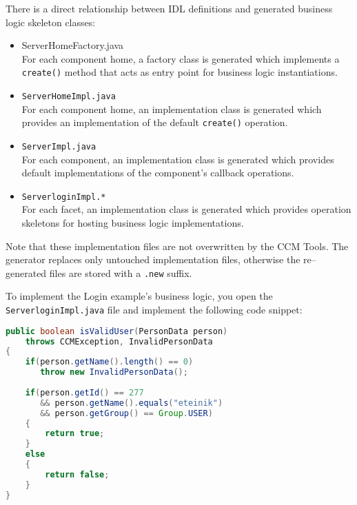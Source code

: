 \vspace{3mm}
There is a direct relationship between IDL definitions and generated business
logic skeleton classes:
\begin{itemize}
	\item {ServerHomeFactory.java} \\
	For each component home, a factory class is generated which implements a {\tt create()}
	method that acts as entry point for business logic instantiations.
		  
	\item {\tt ServerHomeImpl.java}\\
	For each component home, an implementation class is generated which provides an
	implementation of the default {\tt create()} operation.

\item {\tt ServerImpl.java}\\
	For each component, an implementation class is generated which provides 
	default implementations of the component's callback operations.
	
\item {\tt ServerloginImpl.*}\\
	For each facet, an implementation class is generated which provides operation
	skeletons for hosting business logic implementations.
\end{itemize}

\vspace{3mm}
Note that these implementation files are not overwritten by the CCM Tools.
The generator replaces only untouched implementation files, otherwise the 
re--generated files are stored with a {\tt .new} suffix.

 \vspace{3mm}
To implement the Login example's business logic, you open the 
{\tt ServerloginImpl.java} file and implement the following code snippet:
\begin{footnotesize}
\begin{lstlisting}[language=Java]
public boolean isValidUser(PersonData person)
    throws CCMException, InvalidPersonData
{
    if(person.getName().length() == 0)
       throw new InvalidPersonData();
        
    if(person.getId() == 277
       && person.getName().equals("eteinik")
       && person.getGroup() == Group.USER)
    {
        return true;
    }
    else
    {
        return false;
    }
}    
\end{lstlisting}
\end{footnotesize}

